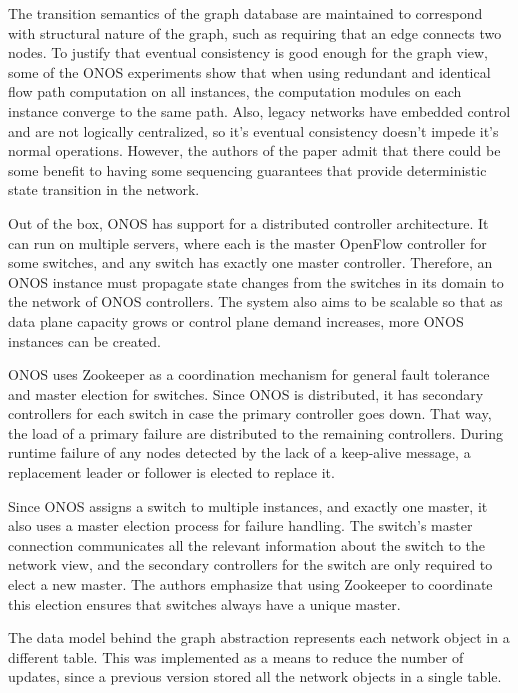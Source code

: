 \documentclass[letterpaper,twocolumn,10pt]{article}
\begin{document}
The transition semantics of the graph database are maintained to correspond with structural nature of the graph, such as requiring that an edge connects two nodes. To justify that eventual consistency is good enough for the graph view, some of the ONOS experiments show that when using redundant and identical flow path computation on all instances, the computation modules on each instance converge to the same path. Also, legacy networks have embedded control and are not logically centralized, so it's eventual consistency doesn't impede it's normal operations. However, the authors of the paper admit that there could be some benefit to having some sequencing guarantees that provide deterministic state transition in the network.

Out of the box, ONOS has support for a distributed controller architecture. It can run on multiple servers, where each is the master OpenFlow controller for some switches, and any switch has exactly one master controller. Therefore, an ONOS instance must propagate state changes from the switches in its domain to the network of ONOS controllers. The system also aims to be scalable so that as data plane capacity grows or control plane demand increases, more ONOS instances can be created.

ONOS uses Zookeeper as a coordination mechanism for general fault tolerance and master election for switches. Since ONOS is distributed, it has secondary controllers for each switch in case the primary controller goes down. That way, the load of a primary failure are distributed to the remaining controllers. During runtime failure of any nodes detected by the lack of a keep-alive message, a replacement leader or follower is elected to replace it.

Since ONOS assigns a switch to multiple instances, and exactly one master, it also uses a master election process for failure handling. The switch's master connection communicates all the relevant information about the switch to the network view, and the secondary controllers for the switch are only required to elect a new master. The authors emphasize that using Zookeeper to coordinate this election ensures that switches always have a unique master. 

The data model behind the graph abstraction represents each network object in a different table. This was implemented as a means to reduce the number of updates, since a previous version stored all the network objects in a single table. 

\end{document}
